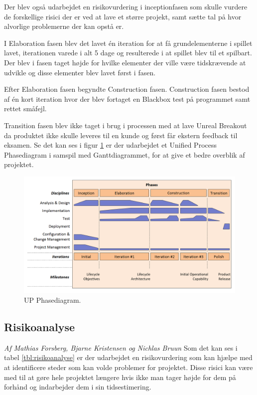 Der blev også udarbejdet en risikovurdering i inceptionfasen som skulle vurdere de forskellige risici der er ved at lave et større projekt, samt sætte tal på hvor alvorlige problemerne der kan opstå er. 

I Elaboration fasen blev det lavet én iteration for at få grundelementerne i spillet lavet, iterationen varede i alt 5 dage og resulterede i at spillet blev til et spilbart. Der blev i fasen taget højde for hvilke elementer der ville være tidskrævende at udvikle og disse elementer blev lavet først i fasen. 

Efter Elaboration fasen begyndte Construction fasen. Construction fasen bestod af én kort iteration hvor der blev fortaget en Blackbox test på programmet samt rettet småfejl. 

Transition fasen blev ikke taget i brug i processen med at lave Unreal Breakout da produktet ikke skulle leveres til en kunde og først får ekstern feedback til eksamen. Se det kan ses i figur \ref{dia:upphase} er der udarbejdet et Unified Process Phasediagram i samspil med Ganttdiagrammet, for at give et bedre overblik af projektet.

\begin{figure}
	\begin{center}
		\caption{UP Phasediagram.}
		\label{dia:upphase}
		\includegraphics[width=0.98\linewidth]{pictures/up/up-phase}
	\end{center}
\end{figure}

\subsection{Risikoanalyse}
\textit{Af Mathias Forsberg, Bjarne Kristensen og Nichlas Bruun}\newline
Som det kan ses i tabel \ref{tbl:risikoanalyse} er der udarbejdet en risikovurdering som kan hjælpe med at identificere steder som kan volde problemer for projektet. Disse risici kan være med til at gøre hele projektet længere hvis ikke man tager højde for dem på forhånd og indarbejder dem i sin tidsestimering.

